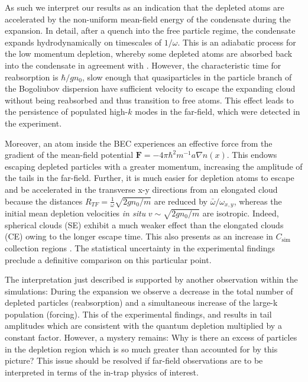 	As such we interpret our results as an indication that the depleted atoms are accelerated by the non-uniform mean-field energy of the condensate during the expansion.
	In detail, after a quench into the free particle regime, the condensate expands hydrodynamically on timescales of $1/\omega$. 
	This is an adiabatic process for the low momentum depletion, whereby some depleted atoms are absorbed back into the condensate in agreement with \cite{Qu16}.
	However, the characteristic time for reabsorption is $\hbar/gn_0$, slow enough that quasiparticles in the particle branch of the Bogoliubov dispersion have sufficient velocity to escape the expanding cloud without being reabsorbed and thus transition to free atoms. 
	This effect leads to the persistence of populated high-$k$ modes in the far-field, which were detected in the experiment.

	Moreover, an atom inside the BEC experiences an effective force from the gradient of the mean-field potential $\textbf{F} = -4\pi\hbar^2 m^{-1}a \nabla  n(x)$. 
	This endows escaping depleted particles with a greater momentum, increasing the amplitude of the tails in the far-field. 
	Further, it is much easier for depletion atoms to escape and be accelerated in the transverse x-y directions from an elongated cloud because the distances $R_{TF}=\frac{1}{\omega}\sqrt{2gn_0/m}$ are reduced by $\bar{\omega}/\omega_{x,y}$, whereas the initial mean depletion velocities \textit{in situ} $v\sim \sqrt{2gn_0/m}$ are isotropic.
	Indeed, spherical clouds (SE) exhibit a much weaker effect than the elongated clouds (CE) owing to the longer escape time.
	This also presents as an increase in $C_\textrm{sim}$  collection regions . 
	The statistical uncertainty in the experimental findings preclude a definitive comparison on this particular point.

	The interpretation just described is supported by another observation within the simulations:
	During the expansion we observe a decrease in the total number of depleted particles (reabsorption) and a simultaneous increase of the large-k population (forcing). 
	This  %
	of the experimental findings, and results in tail amplitudes which are consistent with the quantum depletion multiplied by a constant factor. 
	However, a mystery remains: Why is there an excess of particles in the depletion region which is so much greater than accounted for by this picture? 
	This issue should be resolved if far-field observations are to be interpreted in terms of the in-trap physics of interest. 
	
